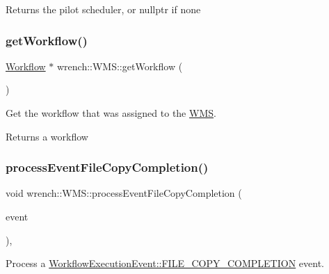 \begin{DoxyReturn}{Returns}
the pilot scheduler, or nullptr if none 
\end{DoxyReturn}
\mbox{\label{classwrench_1_1_w_m_s_a44b586fe5f584755375691a12d815aa3}} 
\subsubsection{\texorpdfstring{get\+Workflow()}{getWorkflow()}}
{\footnotesize\ttfamily \hyperlink{classwrench_1_1_workflow}{Workflow} $\ast$ wrench\+::\+W\+M\+S\+::get\+Workflow (\begin{DoxyParamCaption}{ }\end{DoxyParamCaption})}



Get the workflow that was assigned to the \hyperlink{classwrench_1_1_w_m_s}{W\+MS}. 

\begin{DoxyReturn}{Returns}
a workflow 
\end{DoxyReturn}
\mbox{\label{classwrench_1_1_w_m_s_a61810ee6d81e3eb1d587da28d74bb53e}} 
\subsubsection{\texorpdfstring{process\+Event\+File\+Copy\+Completion()}{processEventFileCopyCompletion()}}
{\footnotesize\ttfamily void wrench\+::\+W\+M\+S\+::process\+Event\+File\+Copy\+Completion (\begin{DoxyParamCaption}\item[{std\+::unique\+\_\+ptr$<$ \hyperlink{classwrench_1_1_file_copy_completed_event}{File\+Copy\+Completed\+Event} $>$}]{event }\end{DoxyParamCaption})\hspace{0.3cm}{\ttfamily [protected]}, {\ttfamily [virtual]}}



Process a \hyperlink{classwrench_1_1_workflow_execution_event_a5611165191fbc4d121d1b141c748a448a01537cae4bfcc4d44d2746cd9a3f303f}{Workflow\+Execution\+Event\+::\+F\+I\+L\+E\+\_\+\+C\+O\+P\+Y\+\_\+\+C\+O\+M\+P\+L\+E\+T\+I\+ON} event. 


